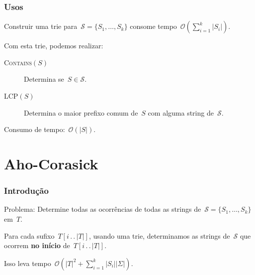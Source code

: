 \documentclass[10pt, compress]{beamer}
\newcommand{\tdots}{\,.\,.\,} %
\newcommand{\E}{\Sigma}
\newcommand{\Oh}{\mathcal{O}}
\newcommand{\cS}{\mathcal{S}}
\begin{document}
\begin{frame}[fragile]
\frametitle{Usos}

Construir uma trie para~$\cS = \{S_1, \ldots, S_k\}$ consome tempo~$\Oh(\sum\limits_{i=1}^k{|S_i|})$.

Com esta trie, podemos realizar:
\begin{description}
\item [\textsc{Contains}$(S)$] Determina se~$S \in \cS$.
\item [\textsc{LCP}$(S)$] Determina o maior prefixo comum de~$S$ com alguma string de~$\cS$.
\end{description}

Consumo de tempo:~$\Oh(|S|)$.


\end{frame}

\section{Aho-Corasick}

\begin{frame}[fragile]
\frametitle{Introdução}

\alert{Problema:} Determine todas as ocorrências de todas as strings de~$\cS = \{S_1, \ldots, S_k\}$ em~$T$.
\vspace{2ex}

\pause

Para cada sufixo~$T[i\tdots |T|]$, usando uma trie, determinamos as strings de~$\cS$ que ocorrem \textbf{no início} de~$T[i\tdots |T|]$.

Isso leva tempo~$\Oh(|T|^2 + \sum\limits_{i=1}^k{|S_i||\E|})$.

\end{frame}
\end{document}
